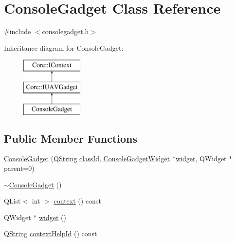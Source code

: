 \hypertarget{class_console_gadget}{\section{\-Console\-Gadget \-Class \-Reference}
\label{class_console_gadget}
}


{\ttfamily \#include $<$consolegadget.\-h$>$}

\-Inheritance diagram for \-Console\-Gadget\-:\begin{figure}[H]
\begin{center}
\leavevmode
\includegraphics[height=3.000000cm]{class_console_gadget}
\end{center}
\end{figure}
\subsection*{\-Public \-Member \-Functions}
\begin{DoxyCompactItemize}
\item 
\hyperlink{group___console_plugin_ga4c0ebb0d0d98dc2464d1a43c68feec60}{\-Console\-Gadget} (\hyperlink{group___u_a_v_objects_plugin_gab9d252f49c333c94a72f97ce3105a32d}{\-Q\-String} \hyperlink{group___core_plugin_ga3878fde66a57220608960bcc3fbeef2c}{class\-Id}, \hyperlink{class_console_gadget_widget}{\-Console\-Gadget\-Widget} $\ast$\hyperlink{group___console_plugin_gaa9fff820073d054b2ab58500206fe54d}{widget}, \-Q\-Widget $\ast$parent=0)
\item 
\hyperlink{group___console_plugin_ga8cfb9cc05b03bf8d1ff2fda3befc6326}{$\sim$\-Console\-Gadget} ()
\item 
\-Q\-List$<$ int $>$ \hyperlink{group___console_plugin_ga0035ad50dabedbce0cb07ecd85ef95f0}{context} () const 
\item 
\-Q\-Widget $\ast$ \hyperlink{group___console_plugin_gaa9fff820073d054b2ab58500206fe54d}{widget} ()
\item 
\hyperlink{group___u_a_v_objects_plugin_gab9d252f49c333c94a72f97ce3105a32d}{\-Q\-String} \hyperlink{group___console_plugin_gad1700fcf695662402ed7faba6ca2a239}{context\-Help\-Id} () const 
\end{DoxyCompactItemize}


